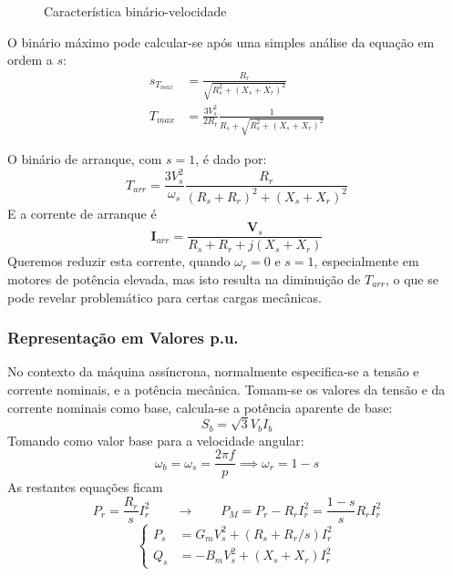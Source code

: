 \begin{minipage}[c]{.4\linewidth}
\begin{figure}[H]
{
    }
    \caption{Característica binário-velocidade}
\end{figure}
\end{minipage}\hfill
\begin{minipage}[c]{.5\linewidth}
    O binário máximo pode calcular-se após uma simples análise da equação em ordem a $s$:
    $$
        \begin{aligned}
            s_{T_{max}} &= \frac{R_r}{\sqrt{R_s^2 + (X_s + X_r)^2}} \\
            T_{max} &= \frac{3V^2_s}{2R_r} \frac{1}{R_s + \sqrt{R_s^2 + (X_s + X_r)^2}}
        \end{aligned}
    $$
\end{minipage}

\vspace{0.5em}
\noindent O binário de arranque, com $s=1$, é dado por:
$$
    T_{arr} = \frac{3V^2_s}{\omega_s} \frac{R_r}{(R_s + R_r)^2 + (X_s + X_r)^2}
$$
E a corrente de arranque é
$$
    \mathbf{I}_{arr} = \frac{\mathbf{V}_s}{R_s + R_r + j(X_s + X_r)}
$$
Queremos reduzir esta corrente, quando $\omega_r = 0$ e $s=1$, especialmente em motores de potência elevada, mas isto resulta na diminuição de $T_{arr}$, o que se pode revelar problemático para certas cargas mecânicas.
\subsubsection{Representação em Valores p.u.}

No contexto da máquina assíncrona, normalmente especifica-se a tensão e corrente nominais, e a potência mecânica. Tomam-se os valores da tensão e da corrente nominais como base, calcula-se a potência aparente de base:
$$
    S_b = \sqrt{3} V_b I_b
$$
Tomando como valor base para a velocidade angular:
$$
    \omega_b = \omega_s = \frac{2\pi f}{p} \implies \omega_r = 1-s
$$
As restantes equações ficam
$$
        P_r = \frac{R_r}{s} I^2_r  \qquad\rightarrow\qquad P_M = P_r - R_r I^2_r = \frac{1-s}{s} R_r I^2_r
$$
$$
    \left\{
    \begin{aligned}
        P_s &= G_m V^2_s + (R_s + R_r/s) I^2_r \\
        Q_s &= -B_m V^2_s + (X_s + X_r) I^2_r
    \end{aligned}\right.
$$

